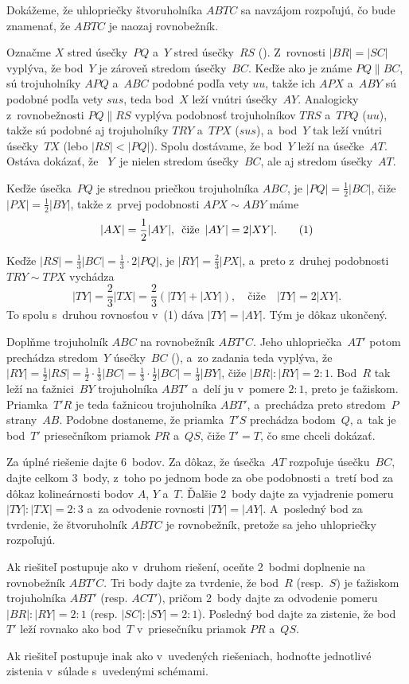 {%
Dokážeme, že uhlopriečky štvoruholníka $ABTC$ sa navzájom
rozpoľujú, čo bude znamenať, že $ABTC$ je naozaj rovnobežník.

Označme $X$ stred úsečky~$PQ$ a~$Y$ stred úsečky~$RS$ (\obr). Z~rovnosti
$|BR| = |SC|$ vyplýva, že bod~$Y$ je zároveň stredom úsečky~$BC$.
Keďže ako je známe $PQ\parallel BC$, sú trojuholníky $APQ$ a~$ABC$
%
podobné podľa vety $uu$, takže ich  $APX$ a~$ABY$
sú podobné podľa vety $sus$, teda bod~$X$ leží vnútri úsečky~$AY$.
Analogicky z~rovnobežnosti $PQ\parallel RS$ vyplýva podobnosť trojuholníkov $TRS$ a~$TPQ$
($uu$), takže sú podobné aj trojuholníky $TRY$ a~$TPX$ ($sus$),
a~bod~$Y$ tak leží vnútri úsečky~$TX$ (lebo $|RS|<|PQ|$). Spolu dostávame,
že bod~$Y$ leží na úsečke~$AT$.
Ostáva dokázať, že~
$Y$~je nielen stredom úsečky~$BC$, ale aj stredom úsečky~$AT$.

Keďže úsečka~$PQ$ je strednou priečkou trojuholníka $ABC$, je
$|PQ| = \frac12|BC|$, čiže $|PX| = \frac12|BY|$,
takže z~prvej podobnosti $APX\sim ABY$ máme
$$
|AX| = \frac12|AY|,\quad\text{čiže}\quad|AY| = 2|XY|. \tag1
$$

Keďže $|RS| = \frac13|BC|=\frac13\cdot 2|PQ|$, je $|RY| = \frac23|PX|$,
a~preto z~druhej podobnosti $TRY\sim TPX$ vychádza %
$$
|TY| = \frac 23|TX| = \frac 23 (|TY|+|XY|),
\quad \text{čiže} \quad |TY| = 2|XY|.
$$
To spolu s~druhou rovnosťou v~(1) dáva $|TY| = |AY|$. Tým je dôkaz ukončený.


\ineries
Doplňme trojuholník $ABC$ na rovnobežník $ABT'C$. Jeho
uhlopriečka~$AT'$ potom prechádza stredom~$Y$ úsečky~$BC$ (\obr),
%
a~zo zadania teda vyplýva, že
$|RY| = \frac12|RS| = \frac12\cdot\frac13|BC|= \frac13\cdot\frac12|BC|= \frac13|BY|$,
čiže $|BR|: |RY| = 2:1$.
Bod~$R$ tak leží na ťažnici~$BY$ trojuholníka $ABT'$ a~delí ju v~pomere $2:1$,
preto je ťažiskom. Priamka~$T'R$ je teda ťažnicou
trojuholníka $ABT'$, a~prechádza preto stredom~$P$ strany~$AB$. Podobne dostaneme,
že priamka~$T'S$ prechádza bodom~$Q$, a~tak je bod~$T'$ priesečníkom
priamok $PR$ a~$QS$, čiže $T' = T$, čo sme chceli dokázať.


\nobreak\medskip\petit\noindent
Za úplné riešenie dajte 6~bodov.
Za dôkaz, že úsečka~$AT$ rozpoľuje úsečku~$BC$,
dajte celkom 3~body, z~toho po jednom bode za obe
podobnosti a~tretí bod za dôkaz kolineárnosti bodov $A$, $Y$ a~$T$. Ďalšie 2~body dajte za vyjadrenie pomeru
$|TY|: |TX| = 2: 3$ a~za odvodenie rovnosti $|TY| = |AY|$.
A~posledný bod za tvrdenie, že štvoruholník $ABTC$ je rovnobežník,
pretože sa jeho uhlopriečky rozpoľujú.

Ak riešiteľ postupuje ako v~druhom riešení, oceňte 2~bodmi doplnenie
na rovnobežník $ABT'C$. Tri body dajte
za tvrdenie, že bod~$R$ (resp.~$S$) je ťažiskom trojuholníka $ABT'$
(resp. $ACT'$), pričom 2~body dajte za odvodenie pomeru $|BR|: |RY| = 2: 1$ (resp.
$|SC|: |SY| = 2: 1$). Posledný bod dajte za zistenie, že bod~$T'$ leží
rovnako ako bod~$T$ v~priesečníku priamok $PR$ a~$QS$.

Ak riešiteľ postupuje inak ako v~uvedených riešeniach, hodnoťte
jednotlivé zistenia v~súlade s~uvedenými schémami.

\endpetit
\bigbreak
}

